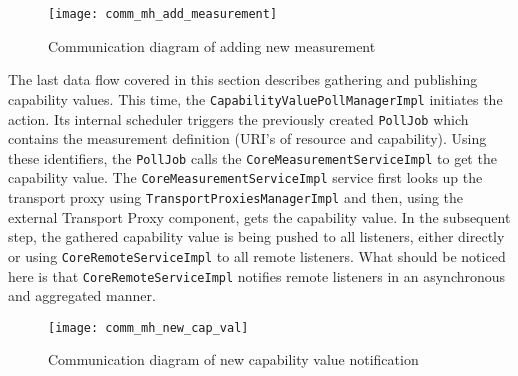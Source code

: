 \begin{figure}[ht]
\centering
\texttt{[image: comm\_mh\_add\_measurement]}
\caption{Communication diagram of adding new measurement}
\label{fig:comm_mh_add_measurement}
\end{figure}

The last data flow covered in this section describes gathering and publishing capability values. This time, the \texttt{CapabilityValuePollManagerImpl} initiates the action. Its internal scheduler triggers the previously created \texttt{PollJob} which contains the measurement definition (URI's of resource and capability). Using these identifiers, the \texttt{PollJob} calls the \texttt{CoreMeasurementServiceImpl} to get the capability value. The \texttt{CoreMeasurementServiceImpl} service first looks up the transport proxy using \texttt{TransportProxiesManagerImpl} and then, using the external Transport Proxy component, gets the capability value. In the subsequent step, the gathered capability value is being pushed to all listeners, either directly or using \texttt{CoreRemoteServiceImpl} to all remote listeners. What should be noticed here is that \texttt{CoreRemoteServiceImpl} notifies remote listeners in an asynchronous and aggregated manner.

\begin{figure}[ht]
\centering
\texttt{[image: comm\_mh\_new\_cap\_val]}
\caption{Communication diagram of new capability value notification}
\label{fig:comm_new_cap_val}
\end{figure}
\pagebreak
